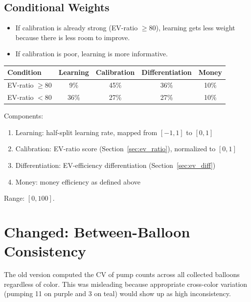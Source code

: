 \documentclass[11pt,a4paper]{article}
\begin{document}
\subsection{Conditional Weights}

\begin{itemize}
    \item If calibration is already strong (EV-ratio $\geq 80$),
          learning gets less weight because there is less room to improve.
    \item If calibration is poor, learning is more informative.
\end{itemize}

\begin{table}[H]
\centering\small
\begin{tabular}{@{}lcccc@{}}
\toprule
\textbf{Condition} & \textbf{Learning} & \textbf{Calibration} & \textbf{Differentiation} & \textbf{Money} \\
\midrule
EV-ratio $\geq 80$ & 9\% & 45\% & 36\% & 10\% \\
EV-ratio $< 80$    & 36\% & 27\% & 27\% & 10\% \\
\bottomrule
\end{tabular}
\end{table}

Components:
\begin{enumerate}[nosep]
    \item Learning: half-split learning rate, mapped from $[-1,1]$ to $[0,1]$
    \item Calibration: EV-ratio score (Section~\ref{sec:ev_ratio}),
          normalized to $[0,1]$
    \item Differentiation: EV-efficiency differentiation
          (Section~\ref{sec:ev_diff})
    \item Money: money efficiency as defined above
\end{enumerate}

Range: $[0, 100]$.


\section{Changed: Between-Balloon Consistency}

The old version computed the CV of pump counts across all collected balloons
regardless of color. This was misleading because appropriate cross-color
variation (pumping 11 on purple and 3 on teal) would show up as high
inconsistency.
\end{document}
